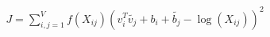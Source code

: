 \documentclass[preview]{standalone}
\begin{document}
\begin{align*}
J = \sum_{i,j=1}^{V} f(X_{ij}) ( v_i^T \tilde{v_j} + b_i + \tilde{b_j} - \log(X_{ij}) ) ^2
\end{align*}
\end{document}
